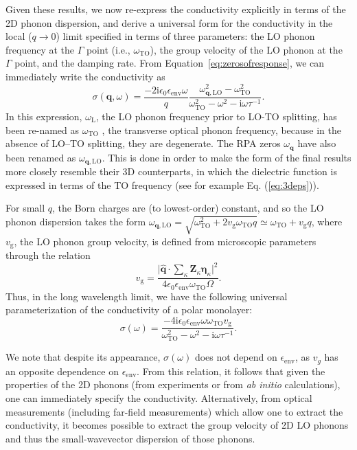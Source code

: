 \documentclass[aps,prb,twocolumn,
	           groupedaddress,superscriptaddress,
               amsfonts,amssymb,amsmath,floatfix,
	           citeautoscript]{revtex4-1}
\newcommand{\iu}{\mathrm{i}}
\begin{document}
Given these results, we now re-express the conductivity explicitly in terms of the 2D phonon dispersion, and derive a universal form for the conductivity in the local ($q\rightarrow 0$) limit specified in terms of three parameters: the LO phonon frequency at the $\Gamma$ point (i.e., $\omega_{\mathrm{TO}}$), the group velocity of the LO phonon at the $\Gamma$ point, and the damping rate. From Equation~\eqref{eq:zerosofresponse}, we can immediately write the conductivity as
  \begin{equation}
  \sigma(\mathbf{q},\omega) = \frac{-2\iu\epsilon_0\epsilon_{\mathrm{env}}\omega}{q}\frac{\omega^2_{\mathbf{q},\mathrm{LO}}-\omega^2_{\mathrm{TO}}}{\omega^2_{\mathrm{TO}}-\omega^2-\iu\omega\tau^{-1}}.
  \end{equation}
 In this expression, $\omega_\mathrm{L}$, the LO phonon frequency prior to LO-TO splitting, has been re-named as $\omega_{\mathrm{TO}}$ , the transverse optical phonon frequency, because in the absence of LO--TO splitting, they are degenerate. The RPA zeros $\omega_{\mathbf{q}}$ have also been renamed as $\omega_{\mathbf{q},\mathrm{LO}}$. This is done in order to make the form of the final results more closely resemble their 3D counterparts, in which the dielectric function is expressed in terms of the TO frequency (see for example Eq. (\ref{eq:3deps})). 
 
 For small $q$,  the Born charges are (to lowest-order) constant, and so the LO phonon dispersion takes the form $\omega_{\mathbf{q},\mathrm{LO}}=\sqrt{\omega^2_{\mathrm{TO}}+2v_{\mathrm{g}}\omega_{\mathrm{TO}}q} \simeq \omega_{\mathrm{TO}} + v_{\mathrm{g}}q$, where $v_{\mathrm{g}}$, the LO phonon group velocity, is defined from microscopic parameters through the relation
 \begin{equation}
    v_{\mathrm{g}} = \frac{\Big|\hat{\mathbf{q}}\cdot \sum_\kappa \mathbf{Z}_\kappa\boldsymbol{\eta}_\kappa\Big|^2 }{4\epsilon_0 \epsilon_{\mathrm{env}}\omega_{\mathrm{TO}}\Omega}. 
\end{equation}
Thus, in the long wavelength limit, we have the following universal parameterization of the conductivity of a polar monolayer:
\begin{equation}
    \sigma(\omega) =  \frac{-4\iu\epsilon_0\epsilon_{\mathrm{env}}\omega\omega_{\mathrm{TO}}v_{\mathrm{g}}}{\omega^2_{\mathrm{TO}}-\omega^2-\iu\omega\tau^{-1}}.
    \label{eq:localsigma}
\end{equation}

We note that despite its appearance, $\sigma(\omega)$ does not depend on $\epsilon_{\mathrm{env}}$, as $v_g$ has an opposite dependence on $\epsilon_{\mathrm{env}}$. From this relation, it follows that given the properties of the 2D phonons (from experiments or from \emph{ab initio} calculations), one can immediately specify the conductivity. Alternatively, from optical measurements (including far-field measurements) which allow one to extract the conductivity, it becomes possible to extract the group velocity of 2D LO phonons and thus the small-wavevector dispersion of those phonons. 
  
\end{document}
